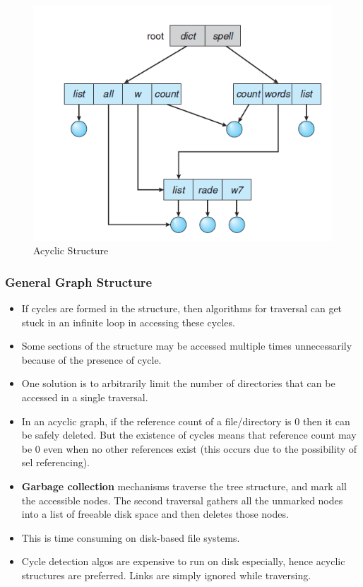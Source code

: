 \documentclass{article}
\theoremstyle{plain}
\theoremstyle{definition}
\begin{document}
\begin{figure}
    \centering
    \includegraphics[scale=0.8]{os5.png}
    \caption{Acyclic Structure}
    \label{fig:my_label_16}
\end{figure}

\subsubsection{General Graph Structure}
\begin{itemize}
    \item If cycles are formed in the structure, then algorithms for traversal can get stuck in an infinite loop in accessing these cycles.
    
    \item Some sections of the structure may be accessed multiple times unnecessarily because of the presence of cycle.
    
    \item One solution is to arbitrarily limit the number of directories that can be accessed in a single traversal. 
    
    \item In an acyclic graph, if the reference count of a file/directory is 0 then it can be safely deleted. But the existence of cycles means that reference count may be 0 even when no other references exist (this occurs due to the possibility of sel referencing).
    
    \item \textbf{Garbage collection} mechanisms traverse the tree structure, and mark all the accessible nodes. The second traversal gathers all the unmarked nodes into a list of freeable disk space and then deletes those nodes. 
    
    \item This is time consuming on disk-based file systems. 
    
    \item Cycle detection algos are expensive to run on disk especially, hence acyclic structures are preferred. Links are simply ignored while traversing. 
\end{itemize}
\end{document}
